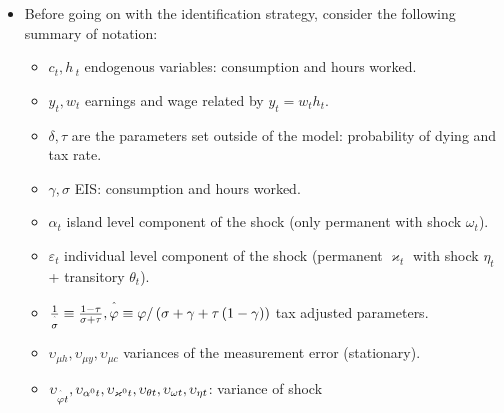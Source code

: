 \documentclass[notes=show]{beamer}
\begin{document}
\begin{frame}%



\begin{itemize}
\item Before going on with the identification strategy, consider the
following summary of notation:

\begin{itemize}
\item $c_{t},h\,_{t}$ endogenous variables: consumption and hours worked.

\item $y_{t},w_{t}$ earnings and wage related by $y_{t}=w_{t}h_{t}$.

\item $\delta ,\tau $ are the parameters set outside of the model:
probability of dying and tax rate.

\item $\gamma ,\sigma $ EIS: consumption and hours worked.

\item $\alpha _{t}$ island level component of the shock (only permanent with
shock $\omega _{t}$). 

\item $\varepsilon _{t}$ individual level component of the shock (permanent $%
\varkappa _{t}$ with shock $\eta _{t}$ + transitory $\theta _{t}$).

\item $\frac{1}{\overset{\symbol{94}}{\sigma }}\equiv \frac{1-\tau }{\sigma
+\tau },\overset{\symbol{94}}{\varphi }\equiv \varphi /\left( \sigma +\gamma
+\tau \left( 1-\gamma \right) \right) $ tax adjusted parameters.

\item  $\upsilon _{\mu h},\upsilon _{\mu y},\upsilon _{\mu c}$ variances of
the measurement error (stationary).

\item $\upsilon _{\overset{\symbol{94}}{\varphi }t},\upsilon _{\alpha
^{0}t},\upsilon _{\varkappa ^{0}t},\upsilon _{\theta t},\upsilon _{\omega
t},\upsilon _{\eta t}$: variance of shock 
\end{itemize}
\end{itemize}

\transboxout%
\end{frame}%
\end{document}
